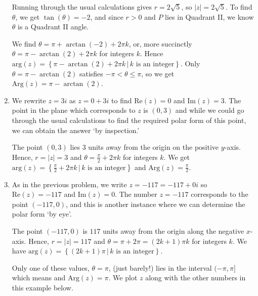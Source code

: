 \documentclass{ximera}
\begin{document}
\begin{ex}
\begin{enumerate}
\smallskip

 Running through the usual calculations gives $r = 2\sqrt{5}$, so $|z| = 2\sqrt{5}$.  To find $\theta$, we get $\tan(\theta) = -2$, and since $r > 0$ and $P$ lies in Quadrant II, we know $\theta$  is a Quadrant II angle.  
 
 \smallskip
 
We find $\theta = \pi + \arctan(-2) + 2\pi k$, or, more succinctly  $\theta = \pi - \arctan(2) + 2\pi k$ for integers $k$.  Hence $\text{arg}(z) = \left\{\pi - \arctan(2) + 2\pi k \, | \, \text{$k$ is an integer}\right\}$.  Only  $\theta = \pi - \arctan(2)$ satisfies $-\pi < \theta \leq \pi$,  so we get $\text{Arg}(z) = \pi - \arctan(2)$. 

\item    We rewrite $z = 3i$ as $z = 0+3i$ to find $\text{Re}(z) = 0$ and $\text{Im}(z) = 3$.  The point in the plane which corresponds to $z$ is $(0,3)$ and while we could go through the usual calculations to find the required polar form of this point, we can obtain the answer `by inspection.'

\smallskip

  The point  $(0,3)$ lies $3$ units away from the origin on the positive $y$-axis.  Hence, $r=|z|=3$ and $\theta = \frac{\pi}{2} + 2\pi k$ for integers $k$. We get $\text{arg}(z) = \left\{ \frac{\pi}{2} + 2\pi k \, | \, \text{$k$ is an integer} \right\}$ and $\text{Arg}(z) = \frac{\pi}{2}$. 

\item As in the previous problem, we write $z = -117 = -117 + 0i$ so $\text{Re}(z) = -117$ and $\text{Im}(z) = 0$. The number $z = -117$ corresponds to the point $(-117,0)$, and this is another instance where  we can determine the polar form `by eye'.  

\smallskip

The point $(-117,0)$ is $117$ units away from the origin along the negative $x$-axis.  Hence, $r=|z|=117$ and $\theta = \pi + 2\pi  = (2k+1)\pi k$ for integers $k$. We have  $\text{arg}(z) = \left\{ (2k+1)\pi \, | \, k \text{ is an  integer} \right\}$.  

\smallskip

Only one of these values, $\theta = \pi$, (just barely!) lies in the interval $(-\pi, \pi]$ which means and $\text{Arg}(z) =\pi$. We plot $z$ along with the other numbers in this example below.


\begin{center}


\end{center}
\end{enumerate}
\end{ex}
\end{document}
